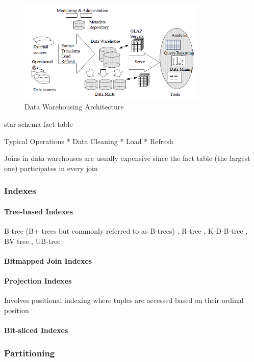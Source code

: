 \documentclass[12pt,a4paper]{article}
\begin{document}
\begin{figure}[!t]
\centering
\includegraphics[width=9cm]{figs/dw.png}
\caption{Data Warehousing Architecture \cite{248616}}
\label{fig:dw}
\end{figure}



star schema
fact table

Typical Operations
    * Data Cleaning
    * Load
    * Refresh

Joins in data warehouses are usually expensive since the fact table (the largest one) participates in every join \cite{628286}

\subsubsection{Indexes}
\paragraph{Tree-based Indexes}
B-tree (B+ trees but commonly referred to as B-trees) \cite{253268}, R-tree \cite{602266, Cheung20011}, K-D-B-tree \cite{582321}, BV-tree \cite{223796}, UB-tree
\cite{bayer1997universal}


\paragraph{Bitmapped Join Indexes}
\cite{212001}


\paragraph{Projection Indexes}
Involves positional indexing where tuples are accessed based on their ordinal position \cite{628286}

\paragraph{Bit-sliced Indexes}


\subsubsection{Partitioning}
\cite{thusoo2010data}
\end{document}
